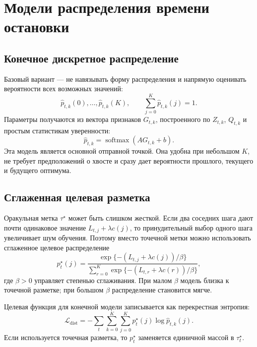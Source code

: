 \section{Модели распределения времени остановки}

\subsection{Конечное дискретное распределение}

Базовый вариант --- не навязывать форму распределения и напрямую оценивать вероятности всех возможных значений:
\begin{equation}
  \widehat p_{t,k}(0),\ldots,\widehat p_{t,k}(K),
  \qquad
  \sum_{j=0}^{K}\widehat p_{t,k}(j)=1.
  \label{eq:finite_distribution}
\end{equation}
Параметры получаются из вектора признаков \(G_{t,k}\), построенного по \(Z_{t,k}\), \(Q_{t,k}\) и простым статистикам уверенности:
\begin{equation}
  \widehat p_{t,k}=\operatorname{softmax}(A G_{t,k}+b).
  \label{eq:finite_head}
\end{equation}
Эта модель является основной отправной точкой. Она удобна при небольшом \(K\), не требует предположений о хвосте и сразу дает вероятности прошлого, текущего и будущего оптимума.

\subsection{Сглаженная целевая разметка}

Оракульная метка \(\tau^\star\) может быть слишком жесткой. Если два соседних шага дают почти одинаковое значение \(L_{t,j}+\lambda c(j)\), то принудительный выбор одного шага увеличивает шум обучения. Поэтому вместо точечной метки можно использовать сглаженное целевое распределение
\begin{equation}
  p^\star_{t}(j)=
  \frac{\exp\{-(L_{t,j}+\lambda c(j))/\beta\}}
  {\sum_{r=0}^{K}\exp\{-(L_{t,r}+\lambda c(r))/\beta\}},
  \label{eq:smoothed_target}
\end{equation}
где \(\beta>0\) управляет степенью сглаживания. При малом \(\beta\) модель близка к точечной разметке; при большом \(\beta\) распределение становится мягче.

Целевая функция для конечной модели записывается как перекрестная энтропия:
\begin{equation}
  \mathcal L_{\mathrm{dist}}=-\sum_{t}\sum_{k=0}^{K}\sum_{j=0}^{K}
  p^\star_t(j)\log \widehat p_{t,k}(j).
  \label{eq:distribution_loss}
\end{equation}
Если используется точечная разметка, то \(p^\star_t\) заменяется единичной массой в \(\tau_t^\star\).

